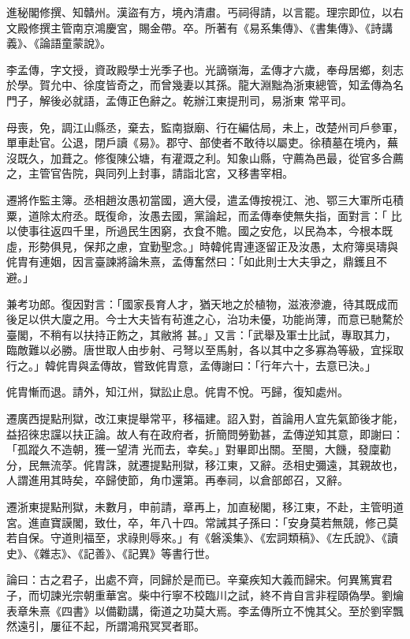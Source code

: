 \begin{pinyinscope}
 進秘閣修撰、知贛州。漢盜有方，境內清肅。丐祠得請，以言罷。理宗即位，以右文殿修撰主管南京鴻慶宮，賜金帶。卒。所著有《易系集傳》、《書集傳》、《詩講義》、《論語童蒙說》。



 李孟傳，字文授，資政殿學士光季子也。光謫嶺海，孟傳才六歲，奉母居鄉，刻志於學。賀允中、徐度皆奇之，而曾幾妻以其孫。龍大淵黜為浙東總管，知孟傳為名門子，解後必就語，孟傳正色辭之。乾辦江東提刑司，易浙東
 常平司。



 母喪，免，調江山縣丞，棄去，監南嶽廟、行在編估局，未上，改楚州司戶參軍，單車赴官。公退，閉戶讀《易》。郡守、部使者不敢待以屬吏。徐積墓在境內，蕪沒既久，加葺之。修復陳公塘，有灌溉之利。知象山縣，守薦為邑最，從官多合薦之，主管官告院，與同列上封事，請詣北宮，又移書宰相。



 遷將作監主簿。丞相趙汝愚初當國，適大侵，遣孟傳按視江、池、鄂三大軍所屯積粟，道除太府丞。既復命，汝愚去國，黨論起，而孟傳奉使無失指，面對言：「
 比以使事往返四千里，所過民生困窮，衣食不贍。國之安危，以民為本，今根本既虛，形勢俱見，保邦之慮，宜勤聖念。」時韓侂胄連逐留正及汝愚，太府簿吳璹與侂胄有連姻，因言臺諫將論朱熹，孟傳奮然曰：「如此則士大夫爭之，鼎鑊且不避。」



 兼考功郎。復因對言：「國家長育人才，猶天地之於植物，滋液滲漉，待其既成而後足以供大廈之用。今士大夫皆有茍進之心，治功未優，功能尚薄，而意已馳騖於臺閣，不稍有以扶持正飭之，其敝將
 甚。」又言：「武舉及軍士比試，專取其力，臨敵難以必勝。唐世取人由步射、弓弩以至馬射，各以其中之多寡為等級，宜採取行之。」韓侂胄與孟傳故，嘗致侂胄意，孟傳謝曰：「行年六十，去意已決。」



 侂胄慚而退。請外，知江州，獄訟止息。侂胄不悅。丐歸，復知處州。



 遷廣西提點刑獄，改江東提舉常平，移福建。詔入對，首論用人宜先氣節後才能，益招徠忠讜以扶正論。故人有在政府者，折簡問勞勤甚，孟傳逆知其意，即謝曰：「孤蹤久不造朝，獲一望清
 光而去，幸矣。」對畢即出關。至閩，大饑，發廩勸分，民無流莩。侂胄誅，就遷提點刑獄，移江東，又辭。丞相史彌遠，其親故也，人謂進用其時矣，卒歸使節，角巾還第。再奉祠，以倉部郎召，又辭。



 遷浙東提點刑獄，未數月，申前請，章再上，加直秘閣，移江東，不赴，主管明道宮。進直寶謨閣，致仕，卒，年八十四。常誡其子孫曰：「安身莫若無競，修己莫若自保。守道則福至，求祿則辱來。」有《磐溪集》、《宏詞類稿》、《左氏說》、《讀史》、《雜志》、《記善》、《記異》等書行世。



 論曰：古之君子，出處不齊，同歸於是而已。辛棄疾知大義而歸宋。何異篤實君子，而切諫光宗朝重華宮。柴中行寧不校臨川之試，終不肯自言非程頤偽學。劉爚表章朱熹《四書》以備勸講，衛道之功莫大焉。李孟傳所立不愧其父。至於劉宰飄然遠引，屢征不起，所謂鴻飛冥冥者耶。



\end{pinyinscope}
